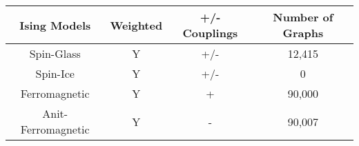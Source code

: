 \documentclass{standalone}
\begin{document}
\begin{tabular}{ |c|c|c|c| } 
    \hline
    Ising Models & Weighted & +/- Couplings & Number of Graphs\\ 
    \hline
    Spin-Glass & Y & +/- & 12,415 \\ 
    Spin-Ice & Y & +/- & 0 \\ 
    Ferromagnetic & Y & + & 90,000  \\ 
    Anit-Ferromagnetic & Y & - & 90,007  \\ 
    \hline
\end{tabular}
\end{document}
